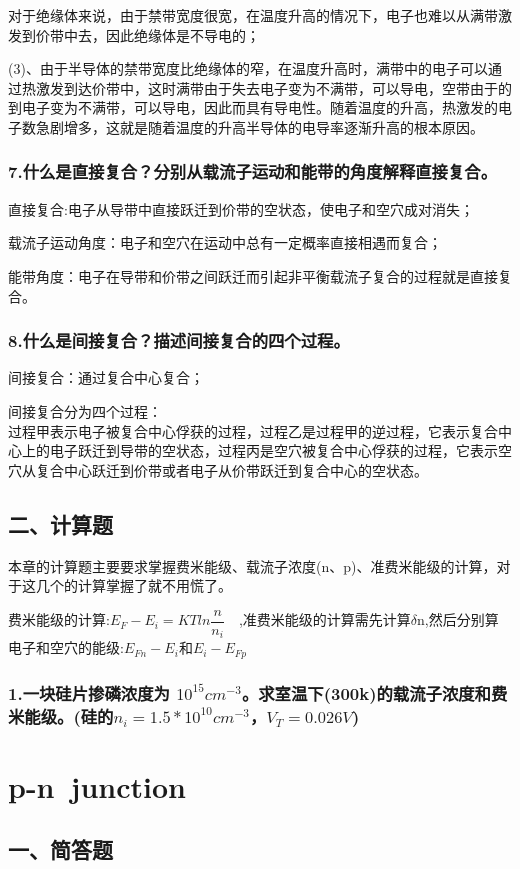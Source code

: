 \documentclass[cn,11pt]{elegantbook}
\begin{document}
对于绝缘体来说，由于禁带宽度很宽，在温度升高的情况下，电子也难以从满带激发到价带中去，因此绝缘体是不导电的；

(3)、由于半导体的禁带宽度比绝缘体的窄，在温度升高时，满带中的电子可以通过热激发到达价带中，这时满带由于失去电子变为不满带，可以导电，空带由于的到电子变为不满带，可以导电，因此而具有导电性。随着温度的升高，热激发的电子数急剧增多，这就是随着温度的升高半导体的电导率逐渐升高的根本原因。

\subsubsection*{7.什么是直接复合？分别从载流子运动和能带的角度解释直接复合。}
直接复合:电子从导带中直接跃迁到价带的空状态，使电子和空穴成对消失；

载流子运动角度：电子和空穴在运动中总有一定概率直接相遇而复合；

能带角度：电子在导带和价带之间跃迁而引起非平衡载流子复合的过程就是直接复合。
\subsubsection*{8.什么是间接复合？描述间接复合的四个过程。}
间接复合：通过复合中心复合；

间接复合分为四个过程：\\
过程甲表示电子被复合中心俘获的过程，过程乙是过程甲的逆过程，它表示复合中心上的电子跃迁到导带的空状态，过程丙是空穴被复合中心俘获的过程，它表示空穴从复合中心跃迁到价带或者电子从价带跃迁到复合中心的空状态。
\subsection*{二、计算题}
{ 本章的计算题主要要求掌握费米能级、载流子浓度(n、p)、准费米能级的计算，对于这几个的计算掌握了就不用慌了。
	
费米能级的计算:$E_{F}-E_{i}=KTln\dfrac{n}{n_{i}}$\ \ ,准费米能级的计算需先计算$\delta$n,然后分别算电子和空穴的能级:$E_{Fn}-E_{i}$和$E_{i}-E_{Fp}$}
\subsubsection*{1.一块硅片掺磷浓度为 $10^{15}cm^{-3}$。求室温下(300k)的载流子浓度和费米能级。(硅的$n_{i}=1.5*10^{10}cm^{-3}$，$V_{T}=0.026V$)}

\section{p-n\ junction}
\subsection*{一、简答题}
\end{document}

